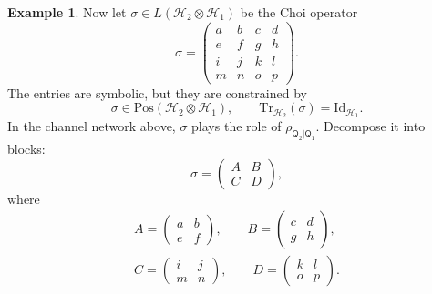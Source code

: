 \documentclass[
    aps,
    pra,
    reprint,
    superscriptaddress,
    nofootinbib
]{revtex4-2}
\theoremstyle{definition}
\newtheorem{example}{Example}[section]
\theoremstyle{plain}
\begin{document}
\begin{example}
    Now let $\sigma\in
    L(\mathcal{H}_{2}\otimes\mathcal{H}_{1})$ be the Choi operator
    \begin{equation}
        \sigma
        =
        \left(
        \begin{array}{cc|cc}
            a&b&c&d\\
            e&f&g&h\\ \hline
            i&j&k&l\\
            m&n&o&p
        \end{array}
        \right).
        \label{eq:choi-state-1}
    \end{equation}
    The entries are symbolic, but they are constrained by
    \begin{equation}
        \sigma\in
        \mathrm{Pos}(\mathcal{H}_{2}\otimes\mathcal{H}_{1}),
        \qquad
        \mathrm{Tr}_{\mathcal{H}_{2}}(\sigma)
        =
        \mathrm{Id}_{\mathcal{H}_{1}}.
    \end{equation}
    In the channel network above, $\sigma$ plays the role of
    $\rho_{\mathsf{Q}_{2}|\mathsf{Q}_{1}}$. Decompose it into blocks:
    \begin{equation}
        \sigma
        =
        \left(
        \begin{array}{c|c}
            A&B\\ \hline
            C&D
        \end{array}
        \right),
    \end{equation}
    where
    \begin{equation}
        \begin{gathered}
        A=
        \begin{pmatrix}
            a&b\\
            e&f
        \end{pmatrix},
        \qquad
        B=
        \begin{pmatrix}
            c&d\\
            g&h
        \end{pmatrix},\\
        C=
        \begin{pmatrix}
            i&j\\
            m&n
        \end{pmatrix},
        \qquad
        D=
        \begin{pmatrix}
            k&l\\
            o&p
        \end{pmatrix}.
        \end{gathered}

\end{equation}
\end{example}
\end{document}
